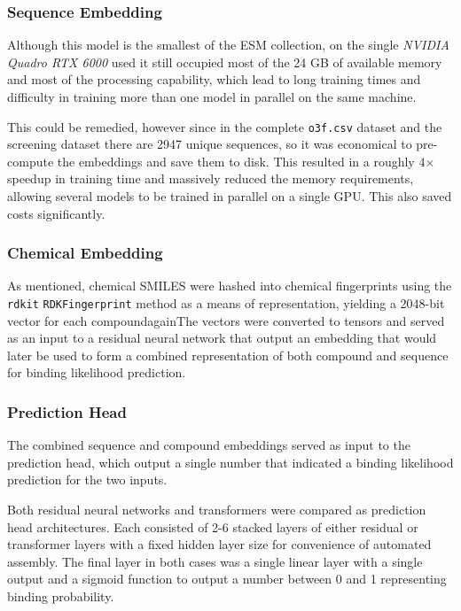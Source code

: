 \documentclass[16pt]{book}
\begin{document}
\subsubsection{Sequence Embedding}


Although this model is the smallest of the ESM collection, on the single \textit{NVIDIA Quadro RTX 6000} used it still occupied most of the 24 GB of available memory and most of the processing capability, which lead to long training times and difficulty in training more than one model in parallel on the same machine.

This could be remedied, however since in the complete \texttt{o3f.csv} dataset and the screening dataset there are 2947 unique sequences, so it was economical to pre-compute the embeddings and save them to disk.
This resulted in a roughly 4$\times$ speedup in training time and massively reduced the memory requirements, allowing several models to be trained in parallel on a single GPU.
This also saved costs significantly.

\subsubsection{Chemical Embedding}

As mentioned, chemical SMILES were hashed into chemical fingerprints using the \texttt{rdkit} \texttt{RDKFingerprint} method as a means of representation, yielding a 2048-bit vector for each compoundagainThe vectors were converted to tensors and served as an input to a residual neural network that output an embedding that would later be used to form a combined representation of both compound and sequence for binding likelihood prediction.

\subsubsection{Prediction Head}

The combined sequence and compound embeddings served as input to the prediction head, which output a single number that indicated a binding likelihood prediction for the two inputs.

Both residual neural networks and transformers were compared as prediction head architectures.
Each consisted of 2-6 stacked layers of either residual or transformer layers with a fixed hidden layer size for convenience of automated assembly.
The final layer in both cases was a single linear layer with a single output and a sigmoid function to output a number between 0 and 1 representing binding probability.
\end{document}
